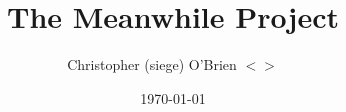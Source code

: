 \documentclass[titlepage,oneside]{book}
\title{The Meanwhile Project}
\author{Christopher (siege) O'Brien $<${\emailLink{}}$>$}
\date{\today}
\begin{document}
\maketitle{}

\tableofcontents{}






\end{document}
